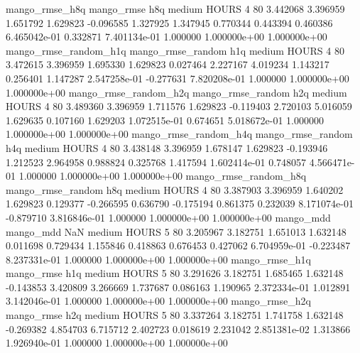        mango_rmse_h8q        mango_rmse                  h8q     medium    HOURS                 4 80  3.442068       3.396959 1.651792       1.629823   -0.096585      1.327925      1.347945     0.770344       0.443394  0.460386 6.465042e-01     0.332871   7.401134e-01            1.000000    1.000000e+00        1.000000e+00
mango_rmse_random_h1q mango_rmse_random                  h1q     medium    HOURS                 4 80  3.472615       3.396959 1.695330       1.629823    0.027464      2.227167      4.019234     1.143217       0.256401  1.147287 2.547258e-01    -0.277631   7.820208e-01            1.000000    1.000000e+00        1.000000e+00
mango_rmse_random_h2q mango_rmse_random                  h2q     medium    HOURS                 4 80  3.489360       3.396959 1.711576       1.629823   -0.119403      2.720103      5.016059     1.629635       0.107160  1.629203 1.072515e-01     0.674651   5.018672e-01            1.000000    1.000000e+00        1.000000e+00
mango_rmse_random_h4q mango_rmse_random                  h4q     medium    HOURS                 4 80  3.438148       3.396959 1.678147       1.629823   -0.193946      1.212523      2.964958     0.988824       0.325768  1.417594 1.602414e-01     0.748057   4.566471e-01            1.000000    1.000000e+00        1.000000e+00
mango_rmse_random_h8q mango_rmse_random                  h8q     medium    HOURS                 4 80  3.387903       3.396959 1.640202       1.629823    0.129377     -0.266595      0.636790    -0.175194       0.861375  0.232039 8.171074e-01    -0.879710   3.816846e-01            1.000000    1.000000e+00        1.000000e+00
            mango_mdd         mango_mdd                  NaN     medium    HOURS                 5 80  3.205967       3.182751 1.651013       1.632148    0.011698      0.729434      1.155846     0.418863       0.676453  0.427062 6.704959e-01    -0.223487   8.237331e-01            1.000000    1.000000e+00        1.000000e+00
       mango_rmse_h1q        mango_rmse                  h1q     medium    HOURS                 5 80  3.291626       3.182751 1.685465       1.632148   -0.143853      3.420809      3.266669     1.737687       0.086163  1.190965 2.372334e-01     1.012891   3.142046e-01            1.000000    1.000000e+00        1.000000e+00
       mango_rmse_h2q        mango_rmse                  h2q     medium    HOURS                 5 80  3.337264       3.182751 1.741758       1.632148   -0.269382      4.854703      6.715712     2.402723       0.018619  2.231042 2.851381e-02     1.313866   1.926940e-01            1.000000    1.000000e+00        1.000000e+00
